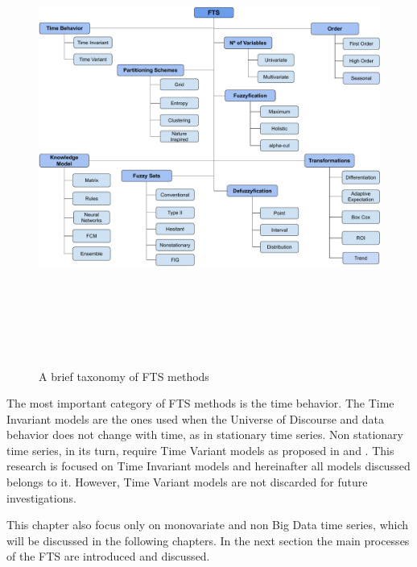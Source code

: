 \begin{figure}
    \centering
    \includegraphics[width=\textwidth, height=15cm]{figures/fts_taxonomy.pdf}
    \caption{A brief taxonomy of FTS methods}
    \label{fig:fts_taxonomy}
\end{figure}

The most important category of FTS methods is the time behavior. The Time Invariant models are the ones used when the Universe of Discourse and data behavior  does not change with time, as in stationary time series. Non stationary time series, in its turn, require Time Variant models as proposed in \cite{Song1994} and \cite{Wong2010}. This research is focused on Time Invariant models and hereinafter all models discussed belongs to it. However, Time Variant models are not discarded for future investigations.

This chapter also focus only on monovariate and non Big Data time series, which will be discussed in the following chapters. In the next section the main processes of the FTS are introduced and discussed.


